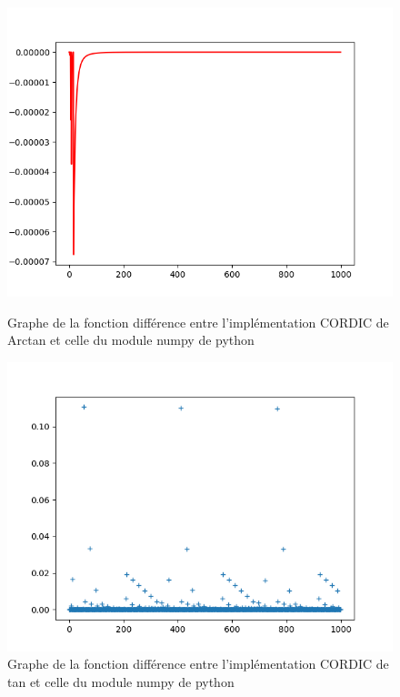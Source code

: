 \documentclass{article}
\begin{document}
\begin{figure}[!htb]
    \begin{minipage}{0.48\textwidth}
        \centering
        \includegraphics[scale=0.5]{Figure_erreurArtan.png}
        \caption{Graphe de la fonction différence entre l'implémentation CORDIC de Arctan et celle du module numpy de python}
        \label{fig:Figure_TanMoinsTan}
    \end{minipage}\hfill
    \begin{minipage}{0.48\textwidth}
        \centering
        \includegraphics[scale=0.5]{Figure_TanMoinsTan.png}
        \caption{Graphe de la fonction différence entre l'implémentation CORDIC de tan et celle du module numpy de python}
        \label{fig:compare_log}
    \end{minipage}
\end{figure}
\end{document}
